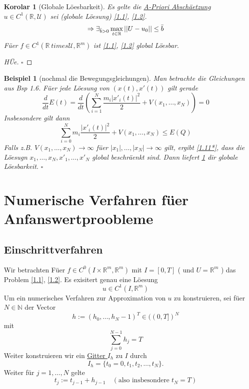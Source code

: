 \documentclass[11pt]{book}
\newcommand{\RR}{\mathbb{R}}
\newcommand{\NN}{\mathbb{N}}
\newcommand{\UU}{\mathcal{U}}
\newcommand{\myTag}[2][]{\tag{#2}\label{#1#2}}
\newcommand{\myQEDEnd}{\hfill\ensuremath{\square}}
\theoremstyle{break}
\theoremstyle{myStyle}
\newcounter{myCounter}[chapter]
\newtheorem{Bsp}[myCounter]{Beispiel}
\newtheorem{Kor}[myCounter]{Korolar}
\begin{document}
\begin{Kor}[Globale L\"oesbarkeit] \label{1.10}
  Es gelte die \uline{A-Priori Absch\"aetzung} \( u \in C^1(\RR,\UU) \) sei 
  (globale L\"oesung) \eqref{1.1}, \eqref{1.2}. \[ 
    \Rightarrow \exists_{\bar{b} > 0} \max_{\substack t \in \RR} ||U - u_0||
    \leq \bar{b} \]
  F\"uer \( f \in C^1(\RR\ times \UU, \RR^m) \) ist \eqref{1.1}, \eqref{1.2}
  global L\"oesbar.
\end{Kor}
\begin{proof} [H\"Ue] \myQEDEnd 
\end{proof}
\begin{Bsp}[nochmal die Bewegungsgleichungen]
  Man betrachte die Gleichungen aus Bsp 1.6. F\"uer jede L\"oesung von \( (x(t),
  x'(t)) \) gilt gerade \[ \dfrac{d}{dt} E(t) = \dfrac{d}{dt}(\sum_{i=1}^N
  \frac{m_i | x'_i (t)|^2}{2} + V(x_1,\dotsc,x_N)) = 0 \] Insbesondere gilt dann
  \[ \sum_{i=0}^N m_i \frac{|x'_i(t)|^2}{2} + V(x_1,\dotsc,x_N) \leq E(Q)
  \myTag[1.11]{*} \]
  Falls z.B. \( V(x_1,\dotsc,x_N) \rightarrow \infty \) f\"uer \( |x_1|,\dotsc,|x_N|
  \rightarrow \infty \) gilt, ergibt \eqref{1.11*}, dass die L\"oesugn \( x_1,
  \dotsc, x_N, x'_1, \dotsc, x'_N \) global beschr\"aenkt sind. Dann liefert
  \ref{1.10} dir globale L\"oesbarkeit.
  \myQEDEnd
\end{Bsp}

\chapter{Numerische Verfahren f\"uer Anfanswertproobleme}

\section{Einschrittverfahren}

Wir betrachten F\"uer \( f\in C^0(I\times \RR^m, \RR^m) \) mit \( I = [0,T] \) (
und \( U = \RR^m \) ) das Problem \eqref{1.1}, \eqref{1.2}. Es exisitert genau
eine L\"oesung \[ u \in C^1(I, \RR^m) \]
Um ein numerisches Verfahren zur Approximation von \( u \) zu konstruieren, sei
f\"uer \( N \in \NN \) der Vector \[ h:= (h_0,\dotsc,h_N-1)^T \in ((0,T])^N \]
mit \[ \sum_{j=0}^{N-1}h_j=T  \]
Weiter konstruieren wir ein \uline{Gitter \( I_h \)} zu \( I \) durch \[
  I_h = \{t_0 = 0, t_1, t_2, \dotsc, t_N\}. \]
Weiter f\"ur \( j= 1,\dotsc,N \) gelte \[t_j := t_{j-1} + h_{j-1} \quad (\text{also
insbesondere } t_N=T) \] 
\end{document}
